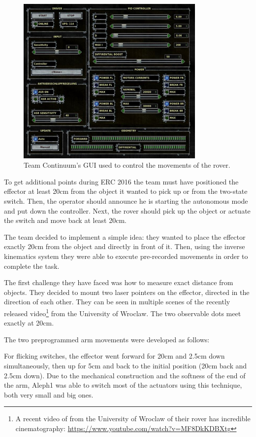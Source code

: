 \documentclass[runningheads,a4paper]{llncs}
\begin{document}
\begin{figure}
\centering
\includegraphics[width=9.2cm]{continuumGUI2}
\caption{Team Continuum's GUI used to control the movements of the rover. }
\label{fig:continuumGUI2}
\end{figure}
 
To get additional points during ERC 2016 the team must have positioned the effector at least 20cm from the object it wanted to pick up or from the two-state switch. Then, the operator should announce he is starting the autonomous mode and put down the controller. Next, the rover should pick up the object or actuate the switch and move back at least 20cm.

The team decided to implement a simple idea: they wanted to place the effector exactly 20cm from the object and directly in front of it. Then, using the inverse kinematics system they were able to execute pre-recorded movements in order to complete the task. 

The first challenge they have faced was how to measure exact distance from objects. They decided to mount two laser pointers on the effector, directed in the direction of each other. They can be seen in multiple scenes of the recently released video\footnote{A recent video of from the University of Wroclaw of their rover has incredible cinematography: \url{https://www.youtube.com/watch?v=MF8DkKDBXtg}} from the University of Wroclaw. The two observable dots meet exactly at 20cm.

The two preprogrammed arm movements were developed as follows:

For flicking switches, the effector went forward for 20cm and 2.5cm down simultaneously, then up for 5cm and back to the initial position (20cm back and 2.5cm down). Due to the mechanical construction and the softness of the end of the arm, Aleph1 was able to switch most of the actuators using this technique, both very small and big ones.
\end{document}
